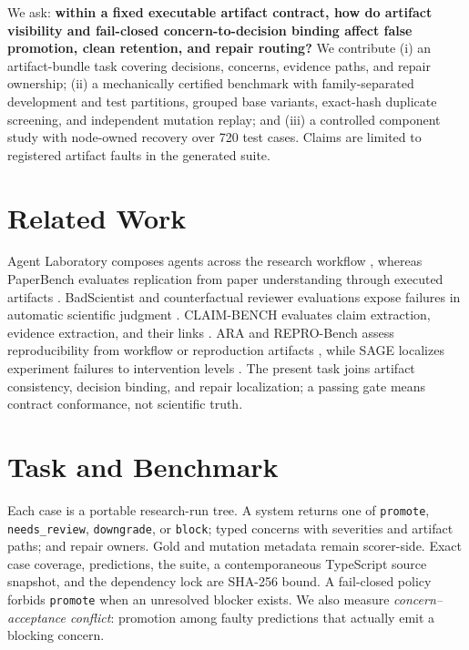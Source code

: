 \documentclass[11pt]{article}
\begin{document}
We ask: \textbf{within a fixed executable artifact contract, how do artifact
visibility and fail-closed concern-to-decision binding affect false promotion,
clean retention, and repair routing?} We contribute (i) an artifact-bundle
task covering decisions, concerns, evidence paths, and repair ownership; (ii) a
mechanically certified benchmark with family-separated development and test
partitions, grouped base variants, exact-hash duplicate screening, and
independent mutation replay; and (iii) a controlled component study with
node-owned recovery over 720 test cases. Claims are limited to registered
artifact faults in the generated suite.

\section{Related Work}

Agent Laboratory composes agents across the research workflow
\cite{schmidgall-etal-2025-agent}, whereas PaperBench evaluates replication
from paper understanding through executed artifacts
\cite{starace2025paperbench}. BadScientist and counterfactual reviewer
evaluations expose failures in automatic scientific judgment
\cite{jiang-etal-2026-badscientist,dycke-gurevych-2026-automatic}.
CLAIM-BENCH evaluates claim extraction, evidence extraction, and their links
\cite{javaji-etal-2025-ai}. ARA and REPRO-Bench assess reproducibility from
workflow or reproduction artifacts \cite{riehl2026ara,hu2025reprobench}, while
SAGE localizes experiment failures to intervention levels
\cite{ma2026reflection}. The present task joins artifact consistency,
decision binding, and repair localization; a passing gate means contract
conformance, not scientific truth.

\section{Task and Benchmark}

Each case is a portable research-run tree. A system returns one of
\texttt{promote}, \texttt{needs\_review}, \texttt{downgrade}, or
\texttt{block}; typed concerns with severities and artifact paths; and repair
owners. Gold and mutation metadata remain scorer-side. Exact case coverage,
predictions, the suite, a contemporaneous TypeScript source snapshot, and the
dependency lock are SHA-256 bound. A fail-closed policy forbids
\texttt{promote} when an unresolved blocker exists. We also measure
\emph{concern--acceptance conflict}: promotion among faulty predictions that
actually emit a blocking concern.
\end{document}
